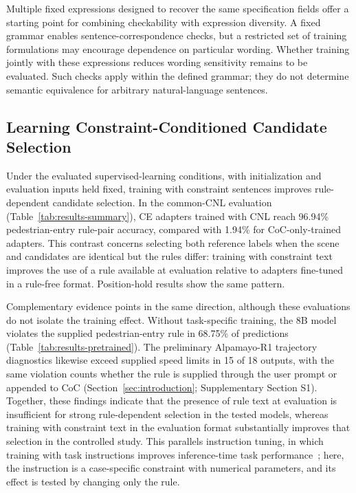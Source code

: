 Multiple fixed expressions designed to recover the same specification fields
offer a starting point for combining checkability with expression diversity.
A fixed grammar enables sentence-correspondence checks, but a restricted set
of training formulations may encourage dependence on particular wording.
Whether training jointly with these expressions reduces wording sensitivity
remains to be evaluated. Such checks apply within the defined grammar; they
do not determine semantic equivalence for arbitrary natural-language sentences.

\subsection{Learning Constraint-Conditioned Candidate Selection}\label{sec:discussion-training}

Under the evaluated supervised-learning conditions, with initialization and
evaluation inputs held fixed, training with constraint
sentences improves rule-dependent candidate selection. In the common-CNL
evaluation (Table~\ref{tab:results-summary}), CE adapters trained with CNL
reach 96.94\% pedestrian-entry rule-pair accuracy, compared with 1.94\% for
CoC-only-trained adapters. This contrast concerns selecting both reference
labels when the scene and candidates are identical but the rules differ:
training with constraint text improves the use of a rule available at
evaluation relative to adapters fine-tuned in a rule-free format.
Position-hold results show the same pattern.

Complementary evidence points in the same direction, although these
evaluations do not isolate the training effect. Without task-specific training,
the 8B model violates the supplied pedestrian-entry rule in 68.75\% of
predictions (Table~\ref{tab:results-pretrained}). The preliminary Alpamayo-R1
trajectory diagnostics likewise exceed supplied speed limits in 15 of 18
outputs, with the same violation counts whether the rule is supplied through
the user prompt or appended to CoC
(Section~\ref{sec:introduction}; Supplementary Section S1). Together, these
findings indicate that the presence of rule text at evaluation is insufficient
for strong rule-dependent selection in the tested models, whereas training
with constraint text in the evaluation format substantially improves that
selection in the controlled study.
This parallels instruction tuning, in which training with task instructions
improves inference-time task performance~\cite{Wei2022}; here, the instruction
is a case-specific constraint with numerical parameters, and its effect is
tested by changing only the rule.

